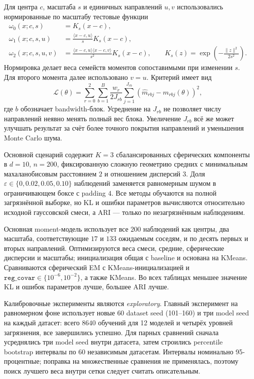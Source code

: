 \documentclass[11pt,a4paper]{article}
\begin{document}
Для центра $c$, масштаба $s$ и единичных направлений $u,v$ использовались
нормированные по масштабу тестовые функции
\begin{align}
  \omega_0(x;c,s) &= K_s(x-c), \\
  \omega_1(x;c,s,u) &=
    \frac{\langle x-c,u\rangle}{s}K_s(x-c), \\
  \omega_2(x;c,s,u,v) &=
    \frac{\langle x-c,u\rangle\langle x-c,v\rangle}{s^2}K_s(x-c),
  \qquad
  K_s(z)=\exp\!\left(-\frac{\lVert z\rVert^2}{2s^2}\right).
\end{align}
Нормировка делает веса семейств моментов сопоставимыми при изменении $s$.
Для второго момента далее использовано $v=u$. Критерий имеет вид
\begin{equation}
  \mathcal L(\theta)=
  \sum_{r=0}^{2}\sum_{b=1}^{B}
  \frac{w_r}{2J_{rb}}
  \sum_{j=1}^{J_{rb}}\left(\widehat m_{rbj}-m_{rbj}(\theta)\right)^2,
  \label{eq:loss}
\end{equation}
где $b$ обозначает bandwidth-блок. Усреднение на $J_{rb}$ не позволяет числу
направлений неявно менять полный вес блока. Увеличение $J_{rb}$ всё же может
улучшать результат за счёт более
точного покрытия направлений и уменьшения Monte Carlo шума.

Основной сценарий содержит $K=3$ сбалансированных сферических компоненты в
$d=10$, $n=200$, фиксированную сложную геометрию средних с минимальным
махаланобисовым расстоянием $2$ и отношением дисперсий $3$. Доля
$\varepsilon\in\{0,0.02,0.05,0.10\}$ наблюдений заменяется равномерным шумом
в ограничивающем боксе с padding $4$. Все методы обучаются на полной
загрязнённой выборке, но KL и ошибки параметров вычисляются относительно
исходной гауссовской смеси, а ARI --- только по незагрязнённым наблюдениям.

Основная moment-модель использует все $200$ наблюдений как центры, два
масштаба, соответствующие $17$ и $133$ ожидаемым соседям, и по десять первых
и вторых направлений. Оптимизируются веса смеси, средние, сферические
дисперсии и масштабы; инициализация общая с baseline и основана на KMeans.
Сравниваются сферический EM с KMeans-инициализацией и
$\texttt{reg\_covar}\in\{10^{-6},10^{-2}\}$, а также KMeans. Во всех
таблицах меньшее значение KL и ошибок параметров лучше, большее ARI лучше.

Калибровочные эксперименты являются \emph{exploratory}. Главный эксперимент
на равномерном фоне использует новые $60$ dataset seed (101--160) и три
model seed на каждый датасет: всего $8640$ обучений для 12 моделей и четырёх
уровней загрязнения, все завершились успешно. Для парных сравнений сначала
усреднялись три model seed внутри датасета, затем строились percentile
bootstrap интервалы по 60 независимым датасетам. Интервалы номинально
95-процентные; поправка на множественные сравнения не применялась, поэтому
поиск лучшего веса внутри сетки следует считать описательным.
\end{document}
